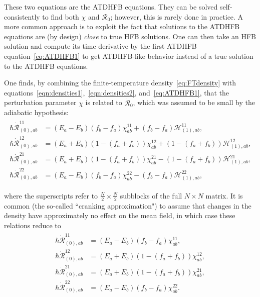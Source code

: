 \noindent These two equations are the ATDHFB equations. They can be solved self-consistently to find both $\chi$ and $\mathcal{R}_0$; however, this is rarely done in practice. A more common approach is to exploit the fact that solutions to the ATDHFB equations are (by design) \textit{close} to true HFB solutions. One can then take an HFB solution and compute its time derivative by the first ATDHFB equation~\eqref{eq:ATDHFB1} to get ATDHFB-like behavior instead of a true solution to the ATDHFB equations.

One finds, by combining the finite-temperature density~\eqref{eq:FTdensity} with equations~\eqref{eqn:densities1},~\eqref{eqn:densities2}, and~\eqref{eq:ATDHFB1}, that the perturbation parameter $\chi$ is related to $\mathcal{\dot{R}}_0$, which was assumed to be small by the adiabatic hypothesis:
\begin{align}\label{eqn:chi-rdot_uncranked}
\begin{aligned}
\hbar \dot{\mathcal{R}}_{(0),ab}^{11} &= (E_a-E_b)(f_b-f_a)\chi_{ab}^{11} + (f_b-f_a)\mathcal{H}^{11}_{(1),ab}, \\
\hbar \dot{\mathcal{R}}_{(0),ab}^{12} &= (E_a+E_b)\left(1-(f_a+f_b)\right)\chi_{ab}^{12} + \left(1-(f_a+f_b)\right)\mathcal{H}^{12}_{(1),ab}, \\
\hbar \dot{\mathcal{R}}_{(0),ab}^{21} &= (E_a+E_b)\left(1-(f_a+f_b)\right)\chi_{ab}^{21} - \left(1-(f_a+f_b)\right)\mathcal{H}^{21}_{(1),ab}, \\
\hbar \dot{\mathcal{R}}_{(0),ab}^{22} &= (E_a-E_b)(f_b-f_a)\chi_{ab}^{22} - (f_b-f_a)\mathcal{H}^{22}_{(1),ab},
\end{aligned}
\end{align}

\noindent where the superscripts refer to $\frac{N}{2}\times\frac{N}{2}$ subblocks of the full $N\times N$ matrix. It is common (the so-called ``cranking approximation") to assume that changes in the density have approximately no effect on the mean field, in which case these relations reduce to
\begin{align}\label{eqn:chi-rdot}
\begin{aligned}
\hbar \dot{\mathcal{R}}_{(0),ab}^{11} &= (E_a-E_b)(f_b-f_a)\chi_{ab}^{11}, \\
\hbar \dot{\mathcal{R}}_{(0),ab}^{12} &= (E_a+E_b)\left(1-(f_a+f_b)\right)\chi_{ab}^{12}, \\
\hbar \dot{\mathcal{R}}_{(0),ab}^{21} &= (E_a+E_b)\left(1-(f_a+f_b)\right)\chi_{ab}^{21}, \\
\hbar \dot{\mathcal{R}}_{(0),ab}^{22} &= (E_a-E_b)(f_b-f_a)\chi_{ab}^{22}.
\end{aligned}
\end{align}

